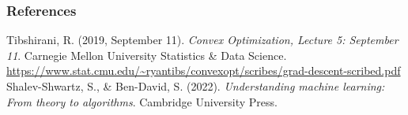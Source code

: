 \begin{vbframe}
\frametitle{References}
\footnotesize{
\begin{thebibliography}{99}
Tibshirani, R. (2019, September 11). \textit{Convex Optimization, Lecture 5: September 11}. Carnegie Mellon University Statistics \& Data Science. \url{https://www.stat.cmu.edu/~ryantibs/convexopt/scribes/grad-descent-scribed.pdf}
 Shalev-Shwartz, S., \& Ben-David, S. (2022). \textit{Understanding machine learning: From theory to algorithms}. Cambridge University Press. 
\end{thebibliography}
}
\end{vbframe}

\endlecture

